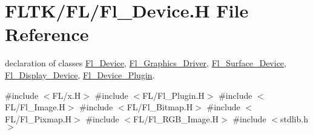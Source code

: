 \hypertarget{_fl___device_8_h}{}\section{F\+L\+T\+K/\+F\+L/\+Fl\+\_\+\+Device.H File Reference}
\label{_fl___device_8_h}


declaration of classes \hyperlink{class_fl___device}{Fl\+\_\+\+Device}, \hyperlink{class_fl___graphics___driver}{Fl\+\_\+\+Graphics\+\_\+\+Driver}, \hyperlink{class_fl___surface___device}{Fl\+\_\+\+Surface\+\_\+\+Device}, \hyperlink{class_fl___display___device}{Fl\+\_\+\+Display\+\_\+\+Device}, \hyperlink{class_fl___device___plugin}{Fl\+\_\+\+Device\+\_\+\+Plugin}.  


{\ttfamily \#include $<$F\+L/x.\+H$>$}\newline
{\ttfamily \#include $<$F\+L/\+Fl\+\_\+\+Plugin.\+H$>$}\newline
{\ttfamily \#include $<$F\+L/\+Fl\+\_\+\+Image.\+H$>$}\newline
{\ttfamily \#include $<$F\+L/\+Fl\+\_\+\+Bitmap.\+H$>$}\newline
{\ttfamily \#include $<$F\+L/\+Fl\+\_\+\+Pixmap.\+H$>$}\newline
{\ttfamily \#include $<$F\+L/\+Fl\+\_\+\+R\+G\+B\+\_\+\+Image.\+H$>$}\newline
{\ttfamily \#include $<$stdlib.\+h$>$}\newline
